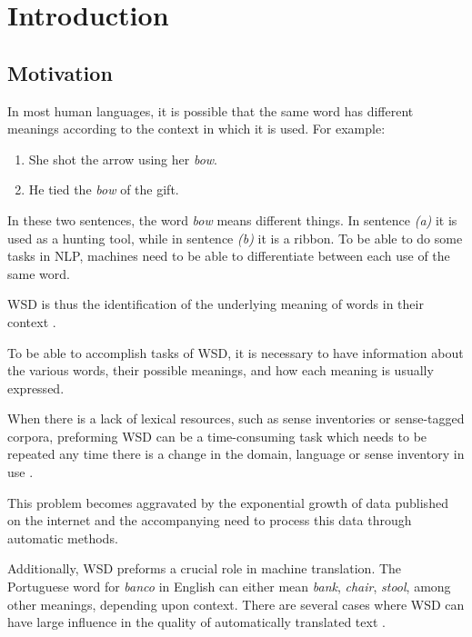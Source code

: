 \chapter{Introduction}

\section{Motivation}

In most human languages, it is possible that the same word has different
meanings according to the context in which it is used. For example:

\begin{enumerate}[label=(\alph*)]
 \item She shot the arrow using her \textit{bow}.
 \item He tied the \textit{bow} of the gift.
\end{enumerate}

In these two sentences, the word \textit{bow} means different things. In
sentence \textit{(a)} it is used as a hunting tool, while in sentence
\textit{(b)} it is a ribbon. To be able to do some tasks in \ac{NLP}, machines
need to be able to differentiate between each use of the same word.

\ac{WSD} is thus the identification of the underlying meaning of words in their
context \cite{navigli2009word}.

To be able to accomplish tasks of \ac{WSD}, it is necessary to have information
about the various words, their possible meanings, and how each meaning is
usually expressed.

When there is a lack of lexical resources, such as sense inventories or
sense-tagged corpora, preforming \ac{WSD} can be a time-consuming task which
needs to be repeated any time there is a change in the domain, language or
sense inventory in use \cite{ng1997getting}.

This problem becomes aggravated by the exponential growth of data published on
the internet \cite{james2014data,james2016data} and the accompanying need to
process this data through automatic methods.

Additionally, \ac{WSD} preforms a crucial role in machine translation. The
Portuguese word for \emph{banco} in English can either mean \emph{bank},
\emph{chair}, \emph{stool}, among other meanings, depending upon context. There
are several cases where \ac{WSD} can have large influence in the quality of
automatically translated text \cite{navigli2009word}.

